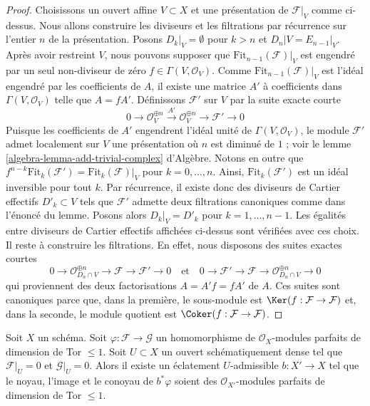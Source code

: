 \begin{proof}
\medskip\noindent
Choisissons un ouvert affine $V \subset X$ et une présentation de $\mathcal{F}|_V$
comme ci-dessus. Nous allons construire les diviseurs et les filtrations par récurrence
sur l'entier $n$ de la présentation. Posons $D_k|_V = \emptyset$
pour $k > n$ et $D_n|V = E_{n - 1}|_V$.
Après avoir restreint $V$, nous pouvons supposer que
$\text{Fit}_{n - 1}(\mathcal{F})|_V$ est engendré par un
seul non-diviseur de zéro $f \in \Gamma(V, \mathcal{O}_V)$.
Comme $\text{Fit}_{n - 1}(\mathcal{F})|_V$ est l'idéal engendré
par les coefficients de $A$, il existe une matrice
$A'$ à coefficients dans $\Gamma(V, \mathcal{O}_V)$ telle que $A = fA'$.
Définissons $\mathcal{F}'$ sur $V$ par la suite exacte courte
$$
0 \to \mathcal{O}_V^{\oplus n} \xrightarrow{A'} \mathcal{O}_V^{\oplus n} \to
\mathcal{F}' \to 0
$$
Puisque les coefficients de $A'$ engendrent l'idéal unité de
$\Gamma(V, \mathcal{O}_V)$, le module $\mathcal{F}'$ admet localement sur $V$
une présentation où $n$ est diminué de
$1$ ; voir le lemme \ref{algebra-lemma-add-trivial-complex} d'Algèbre.
Notons en outre que
$f^{n - k}\text{Fit}_k(\mathcal{F}') = \text{Fit}_k(\mathcal{F})|_V$
pour $k = 0, \ldots, n$. Ainsi, $\text{Fit}_k(\mathcal{F}')$
est un idéal inversible pour tout $k$. Par récurrence,
il existe donc des diviseurs de Cartier effectifs $D'_k \subset V$
tels que $\mathcal{F}'$ admette deux filtrations canoniques comme dans l'énoncé
du lemme. Posons alors $D_k|_V = D'_k$ pour $k = 1, \ldots, n - 1$.
Les égalités entre diviseurs de Cartier effectifs
affichées ci-dessus sont vérifiées avec ces choix. Il reste
à construire les filtrations. En effet,
nous disposons des suites exactes courtes
$$
0 \to
\mathcal{O}_{D_n \cap V}^{\oplus n} \to
\mathcal{F} \to \mathcal{F}' \to 0
\quad\text{et}\quad
0 \to
\mathcal{F}' \to \mathcal{F} \to
\mathcal{O}_{D_n \cap V}^{\oplus n} \to 0
$$
qui proviennent des deux factorisations $A = A'f = f A'$ de $A$.
Ces suites sont canoniques parce que, dans la première,
le sous-module est $\Ker(f : \mathcal{F} \to \mathcal{F})$
et, dans la seconde, le module quotient est
$\Coker(f : \mathcal{F} \to \mathcal{F})$.
\end{proof}

\begin{lemma}
\label{lemma-blowup-map-pd1}
Soit $X$ un schéma. Soit $\varphi : \mathcal{F} \to \mathcal{G}$
un homomorphisme de $\mathcal{O}_X$-modules parfaits de dimension de Tor $\leq 1$.
Soit $U \subset X$ un ouvert schématiquement dense
tel que $\mathcal{F}|_U = 0$ et $\mathcal{G}|_U = 0$.
Alors il existe un éclatement $U$-admissible $b : X' \to X$ tel que
le noyau, l'image et le conoyau de $b^*\varphi$ soient des
$\mathcal{O}_{X'}$-modules parfaits de dimension de Tor $\leq 1$.
\end{lemma}

